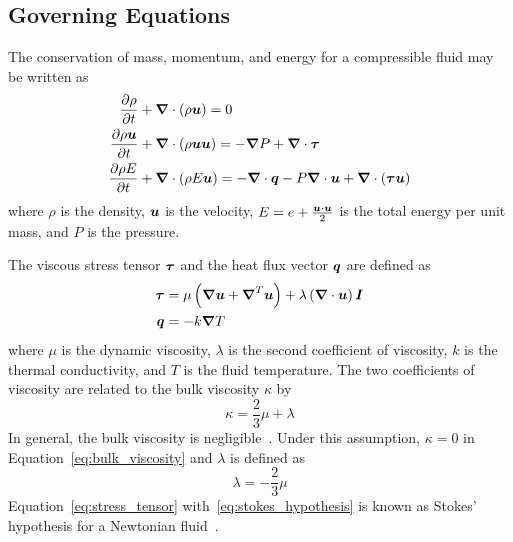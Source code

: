 \documentclass[compress,11pt]{beamer}
\begin{document}
\subsection{Governing Equations}
\frame
{
  The conservation of mass, momentum, and energy for a compressible fluid may be written as
  \begin{align}
    \label{eq:pde_comp_mass}
    {\frac{\partial{\rho}}{\partial{t}}} &+ {\boldsymbol{\nabla}} {}\cdot \left(\rho{\boldsymbol{u}}\right) = 0 \\
    \label{eq:pde_comp_mom}
    {\frac{\partial{\rho{\boldsymbol{u}}}}{\partial{t}}} &+ {\boldsymbol{\nabla}} {}\cdot\left(\rho{\boldsymbol{u}}{\boldsymbol{u}}\right) =
    -{\boldsymbol{\nabla}} {P} + {\boldsymbol{\nabla}} {}\cdot{\boldsymbol{\tau}} \\
    \label{eq:pde_comp_energy}
    {\frac{\partial{\rho E}}{\partial{t}}} &+ {\boldsymbol{\nabla}} {}\cdot\left(\rho E {\boldsymbol{u}}\right) =
    -{\boldsymbol{\nabla}} {}\cdot{\boldsymbol{q}} - P{\boldsymbol{\nabla}} {}\cdot{\boldsymbol{u}} + {\boldsymbol{\nabla}} {}\cdot\left({\boldsymbol{\tau}}{\boldsymbol{u}}\right)  
  \end{align}
  where $\rho$ is the density, ${\boldsymbol{u}}$ is the velocity, $E=e + \frac{{\boldsymbol{u}}\cdot{\boldsymbol{u}}}{2}$ is the total energy per unit mass, and $P$ is the pressure.
}

\frame
{
  \small
  The viscous stress tensor ${\boldsymbol{\tau}}$ and the heat flux vector ${\boldsymbol{q}}$ are defined as
  \begin{align}
    \label{eq:stress_tensor}
    {\boldsymbol{\tau}} &= \mu\left({\boldsymbol{\nabla}} {{\boldsymbol{u}}} + {\boldsymbol{\nabla}}^T {{\boldsymbol{u}}}\right) + \lambda \left({\boldsymbol{\nabla}} {}\cdot{\boldsymbol{u}}\right){\boldsymbol{I}} \\
    \label{eq:fouriers_law}
    {\boldsymbol{q}} &= -k{\boldsymbol{\nabla}} {T}
  \end{align}
  where $\mu$ is the dynamic viscosity, $\lambda$ is the second coefficient of viscosity, $k$ is the thermal conductivity, and $T$ is the fluid temperature.  The two coefficients of viscosity are related to the bulk viscosity $\kappa$ by
  \begin{equation}
    \label{eq:bulk_viscosity}
    \kappa = \frac{2}{3} \mu + \lambda
  \end{equation}
  In general, the bulk viscosity is negligible~\cite{cfmht}. Under this assumption, $\kappa=0$ in Equation~\eqref{eq:bulk_viscosity} and $\lambda$ is defined as
  \begin{equation}
    \label{eq:stokes_hypothesis}
    \lambda = -\frac{2}{3} \mu
  \end{equation}
  Equation~\eqref{eq:stress_tensor} with~\eqref{eq:stokes_hypothesis} is known as Stokes' hypothesis for a Newtonian fluid~\cite{panton_incompressible_flow}.
  \normalsize
}
\end{document}
